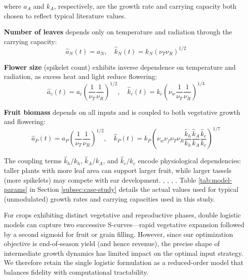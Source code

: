 \documentclass[preprint,12pt]{elsarticle}
\newcommand{\df}[2]{\displaystyle\frac{#1}{#2}}
\begin{document}
\noindent where $a_{A}$ and $k_{A}$, respectively, are the growth rate and carrying capacity both chosen to reflect typical literature values.

\textbf{Number of leaves} depends only on temperature and radiation through the carrying capacity:
\begin{equation}
\hat{a}_{N}(t) = a_{N}, \quad \hat{k}_{N}(t) = k_{N}(\nu_{T}\nu_{R})^{1/2}
\label{eqn:hats-for-N}
\end{equation}

\textbf{Flower size} (spikelet count) exhibits inverse dependence on temperature and radiation, as excess heat and light reduce flowering:
\begin{equation}
\hat{a}_{c}(t) = a_{c}\left(\df{1}{\nu_{T}}\df{1}{\nu_{R}}\right)^{1/2}, \quad \hat{k}_{c}(t) = k_{c}\left(\nu_{w}\df{1}{\nu_{T}}\df{1}{\nu_{R}}\right)^{1/3}
\label{eqn:hats-for-c}
\end{equation}

\textbf{Fruit biomass} depends on all inputs and is coupled to both vegetative growth and flowering:
\begin{equation}
\hat{a}_{P}(t) = a_{P}\left(\df{1}{\nu_{T}}\df{1}{\nu_{R}}\right)^{1/2}, \quad \hat{k}_{P}(t) = k_{P}\left(\nu_{w}\nu_{f}\nu_{T}\nu_{R}\df{\hat{k}_{h}}{k_{h}}\df{\hat{k}_{A}}{k_{A}}\df{\hat{k}_{c}}{k_{c}}\right)^{1/7}
\label{eqn:hats-for-P}
\end{equation}

The coupling terms $\hat{k}_{h}/k_{h}$, $\hat{k}_{A}/k_{A}$, and $\hat{k}_{c}/k_{c}$ encode physiological dependencies: taller plants with more leaf area can support larger fruit, while larger tassels (more spikelets) may compete with ear development. \cite{ren2022agronomic_traits_climate_maize_yield}, \cite{stubbs2023plant_height_maize_lodging}, \cite{wang2022maize_tassel_anther_pollen_genetics}, \cite{silveira2024adaptability_maize_tassel_yield}. Table \ref{tab:model-params} in Section \ref{subsec:case-study} details the actual values used for typical (unmodulated) growth rates and carrying capacities used in this study.

For crops exhibiting distinct vegetative and reproductive phases, double logistic models can capture two successive S-curves---rapid vegetative expansion followed by a second sigmoid for fruit or grain filling. However, since our optimization objective is end-of-season yield (and hence revenue), the precise shape of intermediate growth dynamics has limited impact on the optimal input strategy. We therefore retain the single logistic formulation as a reduced-order model that balances fidelity with computational tractability.
\end{document}
